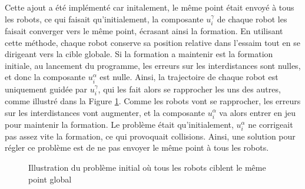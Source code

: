 Cette ajout a été implémenté car initalement, le même point était envoyé à tous les robots, ce qui faisait qu'initialement, la composante $u_i^\gamma$ de chaque robot les faisait converger vers le même point, écrasant ainsi la formation. En utilisant cette méthode, chaque robot conserve sa position relative dans l'essaim tout en se dirigeant vers la cible globale. Si la formation a maintenir est la formation initiale, au lancement du programme, les erreurs sur les interdistances sont nulles, et donc la composante $u_i^\alpha$ est nulle. Ainsi, la trajectoire de chaque robot est uniquement guidée par $u_i^\gamma$, qui les fait alors se rapprocher les uns des autres, comme illustré dans la Figure \ref{fig:globaltargetcollapse}. Comme les robots vont se rapprocher, les erreurs sur les interdistances vont augmenter, et la composante $u_i^\alpha$ va alors entrer en jeu pour maintenir la formation. Le problème était qu'initialement, $u_i^\alpha$ ne corrigeait pas assez vite la formation, ce qui provoquait collisions. Ainsi, une solution pour régler ce problème est de ne pas envoyer le même point à tous les robots.
\begin{figure}[H]
    \centering
    \caption{Illustration du problème initial où tous les robots ciblent le même point global}
    \label{fig:globaltargetcollapse}
\end{figure}

